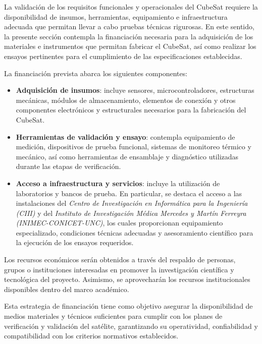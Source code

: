   La validación de los requisitos funcionales y operacionales del CubeSat requiere la
  disponibilidad de insumos, herramientas, equipamiento e infraestructura adecuada que permitan
  llevar a cabo pruebas técnicas rigurosas. En este sentido, la presente sección contempla la
  financiación necesaria para la adquisición de los materiales e instrumentos que permitan
  fabricar el CubeSat, así como realizar los ensayos pertinentes para el cumplimiento de las especificaciones establecidas.

  La financiación prevista abarca los siguientes componentes:

  \begin{itemize}
    \item \textbf{Adquisición de insumos}: incluye sensores, microcontroladores, estructuras mecánicas, módulos de
      almacenamiento, elementos de conexión y otros componentes electrónicos y estructurales
      necesarios para la fabricación del CubeSat.

    \item \textbf{Herramientas de validación y ensayo}: contempla equipamiento de medición,
      dispositivos de prueba funcional, sistemas de monitoreo térmico y mecánico, así como
      herramientas de ensamblaje y diagnóstico utilizadas durante las etapas de verificación.

    \item \textbf{Acceso a infraestructura y servicios}: incluye la utilización de laboratorios y
      bancos de prueba. En particular, se destaca el acceso a las instalaciones del \textit{Centro de
      Investigación en Informática para la Ingeniería (CIII)} y del \textit{Instituto de
      Investigación Médica Mercedes y Martín Ferreyra (INIMEC-CONICET-UNC)}, los cuales
      proporcionan equipamiento especializado, condiciones técnicas adecuadas y asesoramiento científico
      para la ejecución de los ensayos requeridos.

  \end{itemize}

  Los recursos económicos serán obtenidos a través del respaldo de personas, grupos o
  instituciones interesadas en promover la investigación científica y tecnológica del proyecto.
  Asimismo, se aprovecharán los recursos institucionales disponibles dentro del marco académico.

  Esta estrategia de financiación tiene como objetivo asegurar la disponibilidad de medios
  materiales y técnicos suficientes para cumplir con los planes de verificación y validación
  del satélite, garantizando su operatividad, confiabilidad y compatibilidad con los criterios
  normativos establecidos.

